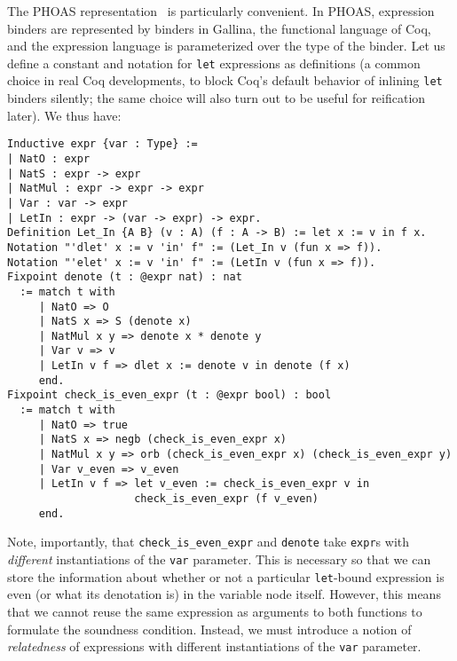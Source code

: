 The PHOAS representation~\cite{PhoasICFP08,weak2013Ciaffaglione} is particularly convenient.
In PHOAS, expression binders are represented by binders in Gallina, the functional language of Coq, and the expression language is parameterized over the type of the binder.
Let us define a constant and notation for \texttt{let} expressions as definitions (a common choice in real Coq developments, to block Coq's default behavior of inlining \texttt{let} binders silently; the same choice will also turn out to be useful for reification later).
We thus have: \label{sec:phoas-expr-def}
\begin{verbatim}
Inductive expr {var : Type} :=
| NatO : expr
| NatS : expr -> expr
| NatMul : expr -> expr -> expr
| Var : var -> expr
| LetIn : expr -> (var -> expr) -> expr.
Definition Let_In {A B} (v : A) (f : A -> B) := let x := v in f x.
Notation "'dlet' x := v 'in' f" := (Let_In v (fun x => f)).
Notation "'elet' x := v 'in' f" := (LetIn v (fun x => f)).
Fixpoint denote (t : @expr nat) : nat
  := match t with
     | NatO => O
     | NatS x => S (denote x)
     | NatMul x y => denote x * denote y
     | Var v => v
     | LetIn v f => dlet x := denote v in denote (f x)
     end.
Fixpoint check_is_even_expr (t : @expr bool) : bool
  := match t with
     | NatO => true
     | NatS x => negb (check_is_even_expr x)
     | NatMul x y => orb (check_is_even_expr x) (check_is_even_expr y)
     | Var v_even => v_even
     | LetIn v f => let v_even := check_is_even_expr v in
                    check_is_even_expr (f v_even)
     end.
\end{verbatim}

Note, importantly, that \texttt{check_is_even_expr} and \texttt{denote} take \texttt{expr}s with \emph{different} instantiations of the \texttt{var} parameter.
This is necessary so that we can store the information about whether or not a particular \texttt{let}-bound expression is even (or what its denotation is) in the variable node itself.
However, this means that we cannot reuse the same expression as arguments to both functions to formulate the soundness condition.
Instead, we must introduce a notion of \emph{relatedness} of expressions with different instantiations of the \texttt{var} parameter.

